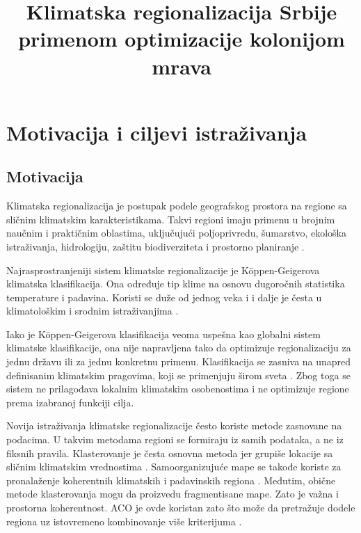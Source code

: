 \documentclass[11pt]{article}
\title{Klimatska regionalizacija Srbije primenom optimizacije kolonijom mrava}
\date{}
\begin{document}
\maketitle
\tableofcontents
\newpage

\section{Motivacija i ciljevi istraživanja}
\label{sec:motivation}

\subsection{Motivacija}

Klimatska regionalizacija je postupak podele geografskog prostora na regione sa sličnim klimatskim karakteristikama. Takvi regioni imaju primenu u brojnim naučnim i praktičnim oblastima, uključujući poljoprivredu, šumarstvo, ekološka istraživanja, hidrologiju, zaštitu biodiverziteta i prostorno planiranje \cite{fovell1993,swenson2019}.

Najrasprostranjeniji sistem klimatske regionalizacije je Köppen-Geigerova klimatska klasifikacija. Ona određuje tip klime na osnovu dugoročnih statistika temperature i padavina. Koristi se duže od jednog veka i i dalje je česta u klimatološkim i srodnim istraživanjima \cite{koppen1936,peel2007,beck2018}.

Iako je Köppen-Geigerova klasifikacija veoma uspešna kao globalni sistem klimatske klasifikacije, ona nije napravljena tako da optimizuje regionalizaciju za jednu državu ili za jednu konkretnu primenu. Klasifikacija se zasniva na unapred definisanim klimatskim pragovima, koji se primenjuju širom sveta \cite{koppen1936,peel2007}. Zbog toga se sistem ne prilagođava lokalnim klimatskim osobenostima i ne optimizuje regione prema izabranoj funkciji cilja.

Novija istraživanja klimatske regionalizacije često koriste metode zasnovane na podacima. U takvim metodama regioni se formiraju iz samih podataka, a ne iz fiksnih pravila. Klasterovanje je česta osnovna metoda jer grupiše lokacije sa sličnim klimatskim vrednostima \cite{fovell1993,carvalho2016}. Samoorganizujuće mape se takođe koriste za pronalaženje koherentnih klimatskih i padavinskih regiona \cite{sheridan2011,swenson2019}. Međutim, obične metode klasterovanja mogu da proizvedu fragmentisane mape. Zato je važna i prostorna koherentnost. ACO je ovde koristan zato što može da pretražuje dodele regiona uz istovremeno kombinovanje više kriterijuma \cite{dorigo1996,dorigo2004}.
\end{document}
